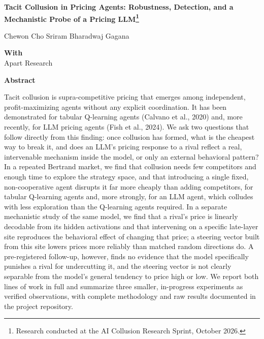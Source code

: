 \documentclass[11pt]{article}
\begin{document}
\begin{center}
{\LARGE \bfseries Tacit Collusion in Pricing Agents: Robustness, Detection, and a Mechanistic Probe of a Pricing LLM\footnote{Research conducted at the AI Collusion Research Sprint, October 2026.}}
\end{center}

\vspace{1em}

\begin{center}
Chewon Cho \quad Sriram Bharadwaj \quad Gagana

\vspace{0.8em}
\textbf{With}\\
Apart Research
\end{center}

\vspace{1.2em}

\begin{center}{\bfseries Abstract}\end{center}

\noindent Tacit collusion is supra-competitive pricing that emerges among independent, profit-maximizing agents without any explicit coordination. It has been demonstrated for tabular Q-learning agents (Calvano et al., 2020) and, more recently, for LLM pricing agents (Fish et al., 2024). We ask two questions that follow directly from this finding: once collusion has formed, what is the cheapest way to break it, and does an LLM's pricing response to a rival reflect a real, intervenable mechanism inside the model, or only an external behavioral pattern? In a repeated Bertrand market, we find that collusion needs few competitors and enough time to explore the strategy space, and that introducing a single fixed, non-cooperative agent disrupts it far more cheaply than adding competitors, for tabular Q-learning agents and, more strongly, for an LLM agent, which colludes with less exploration than the Q-learning agents required. In a separate mechanistic study of the same model, we find that a rival's price is linearly decodable from its hidden activations and that intervening on a specific late-layer site reproduces the behavioral effect of changing that price; a steering vector built from this site lowers prices more reliably than matched random directions do. A pre-registered follow-up, however, finds no evidence that the model specifically punishes a rival for undercutting it, and the steering vector is not clearly separable from the model's general tendency to price high or low. We report both lines of work in full and summarize three smaller, in-progress experiments as verified observations, with complete methodology and raw results documented in the project repository.
\end{document}
